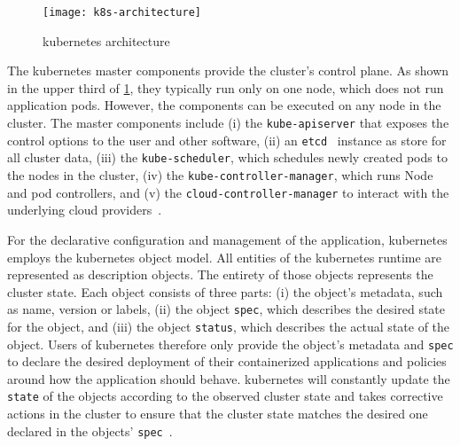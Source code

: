  \begin{figure}
    \centering
    \texttt{[image: k8s-architecture]}
    \caption{\Gls{kubernetes} architecture}
    \label{fig:kubernetes-architecture}
  \end{figure}

  The \gls{kubernetes} master components provide the cluster's control plane.
  As shown in the upper third of \cref{fig:kubernetes-architecture}, they typically run only on one node, which does not run application pods.
  However, the components can be executed on any node in the cluster.
  The master components include
  (i) the \texttt{kube-apiserver} that exposes the control options to the user and other software,
  (ii) an \texttt{etcd}~\cite{etcd} instance as store for all cluster data,
  (iii) the \texttt{kube-scheduler}, which schedules newly created pods to the nodes in the cluster,
  (iv) the \texttt{kube-controller-manager}, which runs Node and \glspl{pod controller}, and
  (v) the \texttt{cloud-controller-manager} to interact with the underlying cloud providers~\cite{kubernetesdoc}.

  For the declarative configuration and management of the application, \gls{kubernetes} employs the \gls{kubernetes} object model.
  All entities of the \gls{kubernetes} runtime are represented as description objects.
  The entirety of those objects represents the cluster state.
  Each object consists of three parts:
  (i) the object's metadata, such as name, version or labels,
  (ii) the object \texttt{spec}, which describes the desired state for the object, and
  (iii) the object \texttt{status}, which describes the actual state of the object.
  Users of \gls{kubernetes} therefore only provide the object's metadata and \texttt{spec} to declare the desired deployment of their containerized applications and policies around how the application should behave.
  \Gls{kubernetes} will constantly update the \texttt{state} of the objects according to the observed cluster state and takes corrective actions in the cluster to ensure that the cluster state matches the desired one declared in the objects' \texttt{spec}~\cite{kubernetesdoc}.


